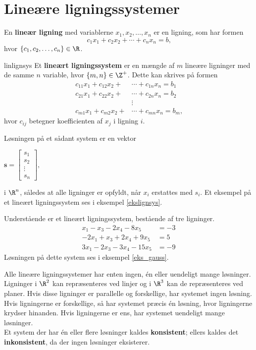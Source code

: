 \section{Lineære ligningssystemer }
%
En \textbf{lineær ligning} med variablerne $x_1,x_2,\ldots ,x_n$ er en ligning, som har formen
$$ c_1x_1+c_2x_2+\cdots+c_nx_n=b \text{,}$$ 
hvor $\{c_1,c_2,\ldots,c_n\} \in \R$. 
%
\begin{defn}{}{linlignsys}
Et \textbf{lineært ligningssystem} er en mængde af $m$ lineære ligninger med de samme $n$ variable, hvor $\{m, n\} \in \Z^+$.
Dette kan skrives på formen
\begin{align*}
c_{11}x_1+c_{12}x_2+&\cdots+c_{1n}x_n=b_1\\
c_{21}x_1+c_{22}x_2+&\cdots+c_{2n}x_n=b_2\\
&\vdots\\
c_{m1}x_1+c_{m2}x_2+&\cdots +c_{mn}x_n=b_m
\text{,}
\end{align*}
hvor $c_{ij}$ betegner koefficienten af $x_j$ i ligning $i$.
\end{defn}
\noindent
Løsningen på et sådant system er en vektor
\begin{center}
$
\mathbf{s} = 
\begin{bmatrix}
s_1\\
s_2\\
\vdots\\
s_n
\end{bmatrix},
$
\end{center}
i $\R ^n$, således at alle ligninger er opfyldt, når $x_i$ erstattes med $s_i$. Et eksempel på et lineært ligningssystem ses i eksempel \ref{ekslignsys}.
%
\\
\begin{eks}
\label{ekslignsys}
Understående er et lineært ligningssystem, bestående af tre ligninger.
%
\begin{align*}
x_1-x_3-2x_4-8x_5&=-3 \\
-2x_1+x_3+2x_4+9x_5&=5 \\
3x_1-2x_3-3x_4-15x_5&=-9
\end{align*}
%
Løsningen på dette system ses i eksempel \ref{eks_gauss}.
%
%
\end{eks}
Alle lineære ligningssystemer har enten ingen, én eller uendeligt mange løsninger.
Ligninger i $\R^2$ kan repræsenteres ved linjer og i $\R^3$ kan de repræsenteres ved planer.
Hvis disse ligninger er parallelle og forskellige, har systemet ingen løsning.
Hvis ligningerne er forskellige, så har systemet præcis én løsning, hvor ligningerne krydser hinanden. 
Hvis ligningerne er ens, har systemet uendeligt mange løsninger.\\
Et system der har én eller flere løsninger kaldes \textbf{konsistent}; ellers kaldes det \textbf{inkonsistent}, da der ingen løsninger eksisterer.
%
%
%
